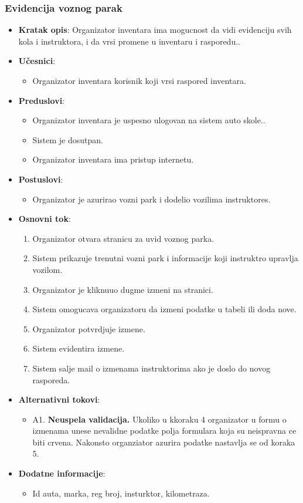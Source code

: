 \subsubsection{Evidencija voznog parak}
\label{subsubsec:vozni park}
\begin{itemize}
  \item \textbf{Kratak opis}: Organizator inventara ima mogucnost da vidi evidenciju svih kola i instruktora, i da vrsi promene u inventaru i rasporedu..
  \item \textbf{Učesnici}:
    \begin{itemize}
    \item Organizator inventara korisnik koji vrsi raspored inventara.
    \end{itemize}
  \item \textbf{Preduslovi}:
    \begin{itemize}
    \item  Organizator inventara je uspesno ulogovan na sistem auto skole..
    \item  Sistem je dosutpan.
    \item  Organizator inventara ima pristup internetu.
    \end{itemize}
  \item \textbf{Postuslovi}:
      \begin{itemize}
      \item  Organizator je azurirao vozni park i dodelio vozilima instruktores.
      \end{itemize}
  \item \textbf{Osnovni tok}:
      \begin{enumerate}
        \item  Organizator otvara stranicu za uvid voznog parka.
        \item Sistem prikazuje trenutni vozni park i informacije koji instruktro upravlja vozilom.
        \item Organizator je kliknuuo dugme izmeni na stranici.
        \item Sistem omogucava organizatoru da izmeni podatke u tabeli ili doda nove.
        \item Organizator potvrdjuje izmene.
        \item Sistem evidentira izmene.
        \item Sistem salje mail o izmenama instruktorima ako je doslo do novog rasporeda.
      \end{enumerate}

  \item \textbf{Alternativni tokovi}:
      \begin{itemize}
        \item A1. \textbf{Neuspela validacija.}
        Ukoliko u kkoraku 4 organizator u formu o izmenama unese nevalidne podatke polja formulara koja su neispravna ce biti crvena. Nakonsto organziator azurira podatke nastavlja se od koraka 5.
      \end{itemize}
      
  \item \textbf{Dodatne informacije}:
      \begin{itemize}
        \item Id auta, marka, reg broj, insturktor, kilometraza. 
      \end{itemize}
\end{itemize}